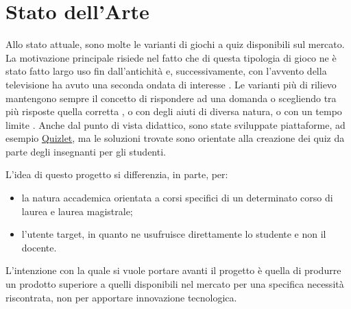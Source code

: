 \section{Stato dell'Arte}
 Allo stato attuale, sono molte le varianti di giochi a quiz disponibili sul mercato. La motivazione principale risiede nel fatto che di questa tipologia di gioco ne è stato fatto largo uso fin dall'antichità \cite{quizgame} e, successivamente, con l'avvento della televisione ha avuto una seconda ondata di interesse \cite{gameshow}. Le varianti più di rilievo mantengono sempre il concetto di rispondere ad una domanda o scegliendo tra più risposte quella corretta \cite{whowantstobeamillionaire}, o con degli aiuti di diversa natura, o con un tempo limite \cite{jeopardy}. 
 Anche dal punto di vista didattico, sono state sviluppate piattaforme, ad esempio \href{https://quizlet.com/}{Quizlet}, ma le soluzioni trovate sono orientate alla creazione dei quiz da parte degli insegnanti per gli studenti.
 
 L'idea di questo progetto si differenzia, in parte, per: 
\begin{itemize}
    \item la natura accademica orientata a corsi specifici di un determinato corso di laurea e laurea magistrale;
    \item l'utente target, in quanto ne usufruisce direttamente lo studente e non il docente.
\end{itemize}
 
L'intenzione con la quale si vuole portare avanti il progetto è quella di produrre un prodotto superiore a quelli disponibili nel mercato per una specifica necessità riscontrata, non per apportare innovazione tecnologica.
